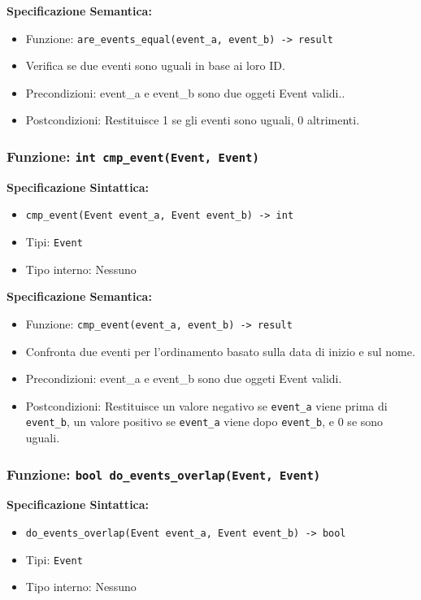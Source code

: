 \documentclass[11pt]{scrartcl} %
\begin{document}
\textbf{Specificazione Semantica:}
\begin{itemize}
\item Funzione: \texttt{are\_events\_equal(event\_a, event\_b) -> result}
\item Verifica se due eventi sono uguali in base ai loro ID.
\item Precondizioni: event\_a e event\_b sono due oggeti Event validi..
\item Postcondizioni: Restituisce 1 se gli eventi sono uguali, 0 altrimenti.
\end{itemize}

\subsubsection{Funzione: \texttt{int cmp\_event(Event, Event)}}

\textbf{Specificazione Sintattica:}
\begin{itemize}
\item \texttt{cmp\_event(Event event\_a, Event event\_b) -> int}
\item Tipi: \texttt{Event}
\item Tipo interno: Nessuno
\end{itemize}

\textbf{Specificazione Semantica:}
\begin{itemize}
\item Funzione: \texttt{cmp\_event(event\_a, event\_b) -> result}
\item Confronta due eventi per l'ordinamento basato sulla data di inizio e sul nome.
\item Precondizioni: event\_a e event\_b sono due oggeti Event validi.
\item Postcondizioni: Restituisce un valore negativo se \texttt{event\_a} viene prima di \texttt{event\_b}, un valore positivo se \texttt{event\_a} viene dopo \texttt{event\_b}, e 0 se sono uguali.
\end{itemize}

\subsubsection{Funzione: \texttt{bool do\_events\_overlap(Event, Event)}}

\textbf{Specificazione Sintattica:}
\begin{itemize}
\item \texttt{do\_events\_overlap(Event event\_a, Event event\_b) -> bool}
\item Tipi: \texttt{Event}
\item Tipo interno: Nessuno
\end{itemize}
\end{document}
